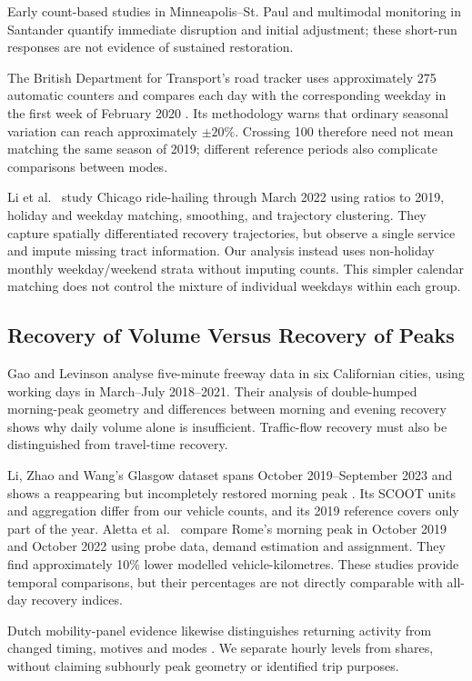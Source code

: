 \documentclass[]{interact}
\begin{document}
Early count-based studies in Minneapolis--St. Paul \cite{liu2021} and multimodal monitoring in Santander \cite{aloi2020} quantify immediate disruption and initial adjustment; these short-run responses are not evidence of sustained restoration.

The British Department for Transport's road tracker uses approximately 275 automatic counters and compares each day with the corresponding weekday in the first week of February 2020 \cite{dft}. Its methodology warns that ordinary seasonal variation can reach approximately $\pm20\%$. Crossing 100 therefore need not mean matching the same season of 2019; different reference periods also complicate comparisons between modes.

Li et al.\ \cite{li2023} study Chicago ride-hailing through March 2022 using ratios to 2019, holiday and weekday matching, smoothing, and trajectory clustering. They capture spatially differentiated recovery trajectories, but observe a single service and impute missing tract information. Our analysis instead uses non-holiday monthly weekday/weekend strata without imputing counts. This simpler calendar matching does not control the mixture of individual weekdays within each group.


\subsection{Recovery of Volume Versus Recovery of Peaks}
Gao and Levinson \cite{gao2024} analyse five-minute freeway data in six Californian cities, using working days in March--July 2018--2021. Their analysis of double-humped morning-peak geometry and differences between morning and evening recovery shows why daily volume alone is insufficient. Traffic-flow recovery must also be distinguished from travel-time recovery.

Li, Zhao and Wang's Glasgow dataset spans October 2019--September 2023 and shows a reappearing but incompletely restored morning peak \cite{glasgow2025}. Its SCOOT units and aggregation differ from our vehicle counts, and its 2019 reference covers only part of the year. Aletta et al.\ \cite{aletta2022} compare Rome's morning peak in October 2019 and October 2022 using probe data, demand estimation and assignment. They find approximately 10\%{} lower modelled vehicle-kilometres. These studies provide temporal comparisons, but their percentages are not directly comparable with all-day recovery indices.

Dutch mobility-panel evidence likewise distinguishes returning activity from changed timing, motives and modes \cite{drift2022}. We separate hourly levels from shares, without claiming subhourly peak geometry or identified trip purposes.
\end{document}
